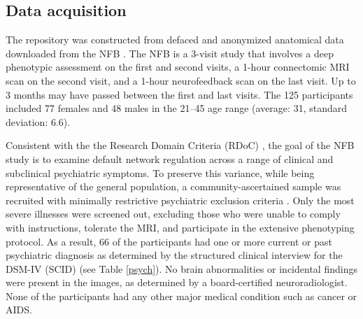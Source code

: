 \subsection*{Data acquisition}

\par The repository was constructed from defaced and anonymized anatomical data downloaded from the NFB \cite{Nooner2012}. The NFB is a 3-visit study that involves a deep phenotypic assessment on the first and second visits, a 1-hour connectomic MRI scan on the second visit, and a 1-hour neurofeedback scan on the last visit. Up to 3 months may have passed between the first and last visits. The 125 participants included 77 females and 48 males in the 21--45 age range (average: 31, standard deviation: 6.6). 

Consistent with the the Research Domain Criteria (RDoC) \cite{Insel2010}, the goal of the NFB study is to examine default network regulation across a range of clinical and subclinical psychiatric symptoms. To preserve this variance, while being representative of the general population, a community-ascertained sample was recruited with minimally restrictive psychiatric exclusion criteria \cite{Nooner2012}. Only the most severe illnesses were screened out, excluding those who were unable to comply with instructions, tolerate the MRI, and participate in the extensive phenotyping protocol. As a result, 66 of the participants had one or more current or past psychiatric diagnosis as determined by the structured clinical interview for the DSM-IV (SCID) \cite{skid} (see Table \ref{psych}). No brain abnormalities or incidental findings were present in the images, as determined by a board-certified neuroradiologist. None of the participants had any other major medical condition such as cancer or AIDS.


